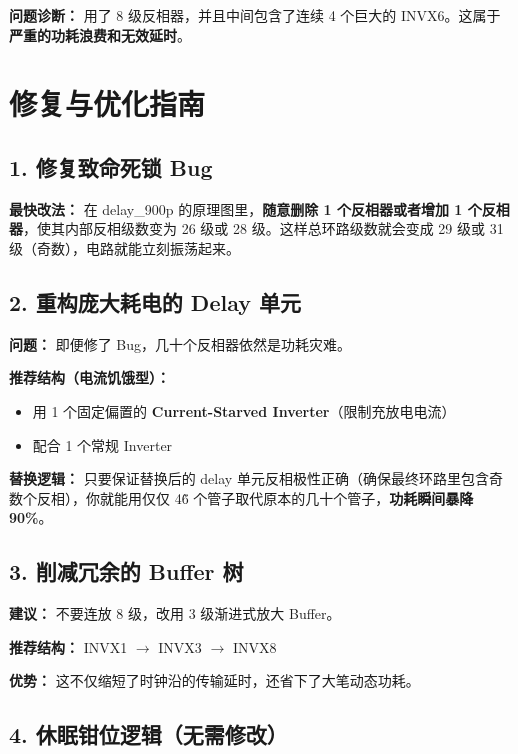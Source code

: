 \documentclass[11pt,a4paper,UTF8]{ctexart}
\begin{document}
\textbf{问题诊断：} 用了 8 级反相器，并且中间包含了连续 4 个巨大的 INVX6。这属于\textbf{严重的功耗浪费和无效延时}。

\section{修复与优化指南}

\subsection{1. 修复致命死锁 Bug}

\begin{tcolorbox}[colback=green!5!white,colframe=green!75!black,title=\textbf{解决方案}]
\textbf{最快改法：} 在 delay\_900p 的原理图里，\textbf{随意删除 1 个反相器或者增加 1 个反相器}，使其内部反相级数变为 26 级或 28 级。这样总环路级数就会变成 29 级或 31 级（奇数），电路就能立刻振荡起来。
\end{tcolorbox}

\subsection{2. 重构庞大耗电的 Delay 单元}

\textbf{问题：} 即便修了 Bug，几十个反相器依然是功耗灾难。

\textbf{推荐结构（电流饥饿型）：}
\begin{itemize}
    \item 用 1 个固定偏置的 \textbf{Current-Starved Inverter}（限制充放电电流）
    \item 配合 1 个常规 Inverter
\end{itemize}

\textbf{替换逻辑：} 只要保证替换后的 delay 单元反相极性正确（确保最终环路里包含奇数个反相），你就能用仅仅 4\~6 个管子取代原本的几十个管子，\textbf{功耗瞬间暴降 90\%}。

\subsection{3. 削减冗余的 Buffer 树}

\textbf{建议：} 不要连放 8 级，改用 3 级渐进式放大 Buffer。

\textbf{推荐结构：} INVX1 $\rightarrow$ INVX3 $\rightarrow$ INVX8

\textbf{优势：} 这不仅缩短了时钟沿的传输延时，还省下了大笔动态功耗。

\subsection{4. 休眠钳位逻辑（无需修改）}
\end{document}
